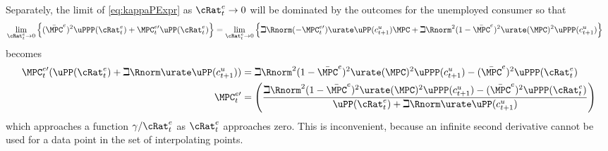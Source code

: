 \documentclass{\handout}
\begin{document}
\begin{CDCPrivate}
Separately, the limit of  \eqref{eq:kappaPExpr} as ${\cRat}^{e}_{t} \rightarrow 0$
 will be dominated by the outcomes for the unemployed consumer
so that
\begin{equation}\begin{gathered}\begin{aligned}
\lim_{{\cRat}^{e}_{t} \rightarrow 0} \left\{ (\bar{\MPC}^{e})^{2} \uPPP({\cRat}^{e}_{t}) +\MPC_{t}^{e\prime}\uPP({\cRat}^{e}_{t}) \right\} & =  \lim_{{\cRat}^{e}_{t} \rightarrow 0}  \left\{ \beth \Rnorm (-\MPC_{t}^{e\prime}) \urate \uPP(c^{u}_{t+1})\MPCU
+ \beth \Rnorm^{2} (1-\bar{\MPC}^{e})^{2} \urate (\MPCU)^{2}\uPPP(c^{u}_{t+1})\right\} \nonumber
\end{aligned}\end{gathered}\end{equation}
becomes
\begin{equation}\begin{gathered}\begin{aligned}
  \MPC_{t}^{e\prime}(\uPP({\cRat}^{e}_{t})+\beth \Rnorm \urate \uPP (c^{u}_{t+1})) & =  \beth \Rnorm^{2}(1-\bar{\MPC}^{e})^2 \urate (\MPCU)^{2}\uPPP(c^{u}_{t+1})-(\bar{\MPC}^{e})^{2} \uPPP({\cRat}^{e}_{t})
\\  \MPC_{t}^{e\prime} & =  \left(\frac{\beth \Rnorm^{2}(1-\bar{\MPC}^{e})^2 \urate (\MPCU)^{2}\uPPP(c^{u}_{t+1})-(\bar{\MPC}^{e})^{2} \uPPP({\cRat}^{e}_{t})}{\uPP({\cRat}^{e}_{t})+\beth \Rnorm \urate \uPP (c^{u}_{t+1})}\right)
\end{aligned}\end{gathered}\end{equation}
which approaches a function $\gamma/{\cRat}^{e}_{t}$ as ${\cRat}^{e}_{t}$ approaches zero.  This is inconvenient, 
because an infinite second derivative cannot be used for a data point in the set of interpolating points.
\end{CDCPrivate}
\end{document}
